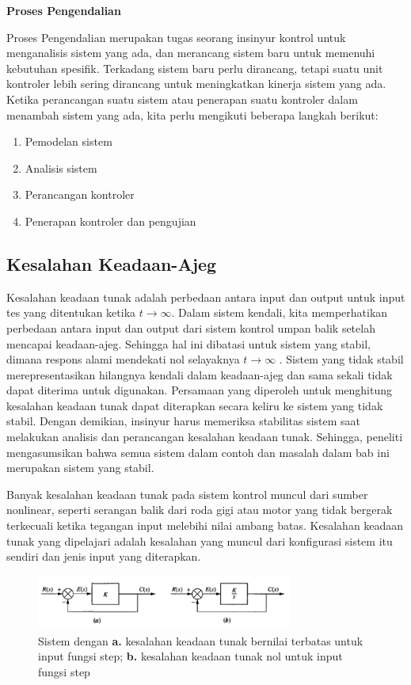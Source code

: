 \noindent	\textbf{Proses Pengendalian}

Proses Pengendalian merupakan tugas seorang insinyur kontrol untuk menganalisis sistem yang ada, dan merancang sistem baru untuk memenuhi kebutuhan spesifik. Terkadang sistem baru perlu dirancang, tetapi suatu unit kontroler lebih sering dirancang untuk meningkatkan kinerja sistem yang ada. Ketika perancangan suatu sistem atau penerapan suatu kontroler dalam menambah sistem yang ada, kita perlu mengikuti beberapa langkah berikut:

\begin{enumerate}
	\item Pemodelan sistem
	\item Analisis sistem
	\item Perancangan kontroler
	\item Penerapan kontroler dan pengujian
\end{enumerate}

\subsection{Kesalahan Keadaan-Ajeg}

Kesalahan keadaan tunak adalah perbedaan antara input dan output untuk input tes yang ditentukan ketika $t \rightarrow \infty$. Dalam sistem kendali, kita memperhatikan perbedaan antara input dan output dari sistem kontrol umpan balik setelah mencapai keadaan-ajeg. Sehingga hal ini dibatasi untuk sistem yang stabil, dimana respons alami mendekati nol selayaknya $t \rightarrow \infty$ . Sistem yang tidak stabil merepresentasikan hilangnya kendali dalam keadaan-ajeg dan sama sekali tidak dapat diterima untuk digunakan. Persamaan yang diperoleh untuk menghitung kesalahan keadaan tunak dapat diterapkan secara keliru ke sistem yang tidak stabil. Dengan demikian, insinyur harus memeriksa stabilitas sistem saat melakukan analisis dan perancangan kesalahan keadaan tunak. Sehingga, peneliti mengasumsikan bahwa semua sistem dalam contoh dan masalah dalam bab ini merupakan sistem yang stabil.

Banyak kesalahan keadaan tunak pada sistem kontrol muncul dari sumber nonlinear, seperti serangan balik dari roda gigi atau motor yang tidak bergerak terkecuali ketika tegangan input melebihi nilai ambang batas. Kesalahan keadaan tunak yang dipelajari adalah kesalahan yang muncul dari konfigurasi sistem itu sendiri dan jenis input yang diterapkan. 

\begin{figure}[!h]
	\centering
	\includegraphics[width=0.75\textwidth]{figures/SSEExample}
	\caption{Sistem dengan \textbf{a.} kesalahan keadaan tunak bernilai terbatas untuk input fungsi step; \textbf{b.} kesalahan keadaan tunak nol untuk input fungsi step}
	\label{fig:3:steadystateerror}
\end{figure}

